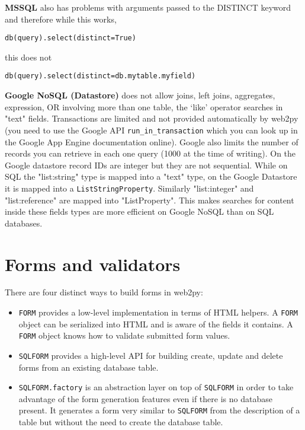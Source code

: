 \documentclass[justified,sixbynine,notoc]{tufte-book}
\def\ft{\small\tt}
\begin{document}
\begin{fullwidth}
{\bf MSSQL} also has problems with arguments passed to the DISTINCT keyword and therefore
while this works,

\begin{lstlisting}
db(query).select(distinct=True)
\end{lstlisting}
\noindent this does not

\begin{lstlisting}
db(query).select(distinct=db.mytable.myfield)
\end{lstlisting}

{\bf Google NoSQL (Datastore)} does not allow joins, left joins, aggregates, expression, OR involving more than one table, the ‘like’ operator searches in "text" fields. Transactions are limited and not provided automatically by web2py (you need to use the Google API {\ft run\_in\_transaction} which you can look up in the Google App Engine documentation online). Google also limits the number of records you can retrieve in each one query (1000 at the time of writing). On the Google datastore record IDs are integer but they are not sequential. While on SQL the "list:string" type is mapped into a "text" type, on the Google Datastore it is mapped into a {\ft ListStringProperty}. Similarly "list:integer" and "list:reference" are mapped into "ListProperty". This makes searches for content inside these fields types are more efficient on Google NoSQL than on SQL databases.

\goodbreak\chapter{Forms and validators}

There are four distinct ways to build forms in web2py:
\begin{itemize}
\item {\ft FORM} provides a low-level implementation in terms of HTML helpers. A {\ft FORM} object can be serialized into HTML and is aware of the fields it contains. A {\ft FORM} object knows how to validate submitted form values.

\item {\ft SQLFORM} provides a high-level API for building create, update and delete forms from an existing database table.

\item {\ft SQLFORM.factory} is an abstraction layer on top of {\ft SQLFORM} in order to take advantage of the form generation features even if there is no database present. It generates a form very similar to {\ft SQLFORM} from the description of a table but without the need to create the database table.


\end{itemize}
\end{fullwidth}
\end{document}
